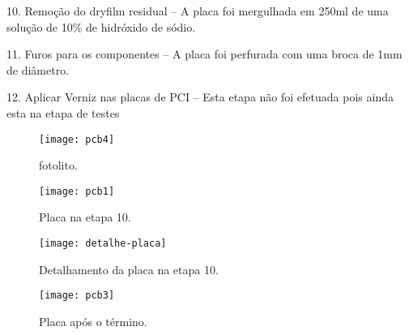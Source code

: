 10. Remoção do dryfilm residual – A placa foi mergulhada em 250ml de uma solução de 10\% de hidróxido de sódio.

11. Furos para os componentes – A placa foi perfurada com uma broca de 1mm de diâmetro.

12. Aplicar Verniz nas placas de PCI – Esta etapa não foi efetuada pois ainda esta na etapa de testes


\begin{figure}[!h]
\centering \texttt{[image: pcb4]}
\caption{fotolito.}
\label{sensortemp}
\end{figure}


\begin{figure}[!h]
\centering \texttt{[image: pcb1]}
\caption{Placa na etapa 10.}
\label{sensortemp}
\end{figure}



\begin{figure}[!h]
\centering \texttt{[image: detalhe-placa]}
\caption{Detalhamento da placa na etapa 10.}
\label{sensortemp}
\end{figure}



\begin{figure}[!h]
\centering \texttt{[image: pcb3]}
\caption{Placa após o término.}
\label{sensortemp}
\end{figure}
